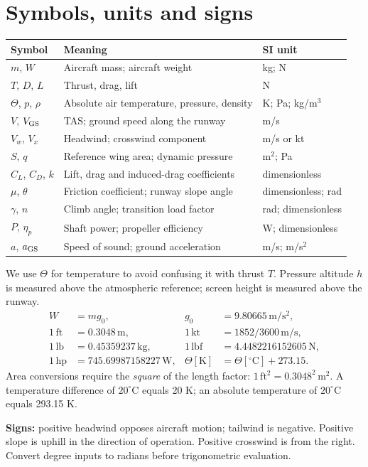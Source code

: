 \documentclass[11pt,letterpaper]{article}
\newcommand{\unit}[1]{\,\mathrm{#1}}
\newcommand{\topic}[1]{\clearpage\section{#1}}
\begin{document}
\topic{Symbols, units and signs}
\par
\begin{tabularx}{\linewidth}{@{}lXl@{}}\toprule
Symbol & Meaning & SI unit\\\midrule
$m$, $W$ & Aircraft mass; aircraft weight & kg; N\\
$T$, $D$, $L$ & Thrust, drag, lift & N\\
$\Theta$, $p$, $\rho$ & Absolute air temperature, pressure, density & K; Pa; kg/m$^3$\\
$V$, $V_{\rm GS}$ & TAS; ground speed along the runway & m/s\\
$V_w$, $V_x$ & Headwind; crosswind component & m/s or kt\\
$S$, $q$ & Reference wing area; dynamic pressure & m$^2$; Pa\\
$C_L$, $C_D$, $k$ & Lift, drag and induced-drag coefficients & dimensionless\\
$\mu$, $\theta$ & Friction coefficient; runway slope angle & dimensionless; rad\\
$\gamma$, $n$ & Climb angle; transition load factor & rad; dimensionless\\
$P$, $\eta_p$ & Shaft power; propeller efficiency & W; dimensionless\\
$a$, $a_{\rm GS}$ & Speed of sound; ground acceleration & m/s; m/s$^2$\\\bottomrule
\end{tabularx}
We use $\Theta$ for temperature to avoid confusing it with thrust $T$.
Pressure altitude $h$ is measured above the atmospheric reference; screen
height is measured above the runway.
\begin{align*}
W&=mg_0, &g_0&=9.80665\unit{m/s^2},\\
1\unit{ft}&=0.3048\unit{m}, &1\unit{kt}&=1852/3600\unit{m/s},\\
1\unit{lb}&=0.45359237\unit{kg}, &1\unit{lbf}&=4.4482216152605\unit{N},\\
1\unit{hp}&=745.69987158227\unit{W}, &\Theta[\mathrm K]&=\Theta[{}^\circ\mathrm C]+273.15.
\end{align*}
Area conversions require the \emph{square} of the length factor:
$1\unit{ft^2}=0.3048^2\unit{m^2}$. A temperature difference of $20^\circ$C equals
20 K; an absolute temperature of $20^\circ$C equals 293.15 K.

\textbf{Signs:} positive headwind opposes aircraft motion; tailwind is negative.
Positive slope is uphill in the direction of operation. Positive crosswind is
from the right. Convert degree inputs to radians before trigonometric evaluation.
\end{document}
